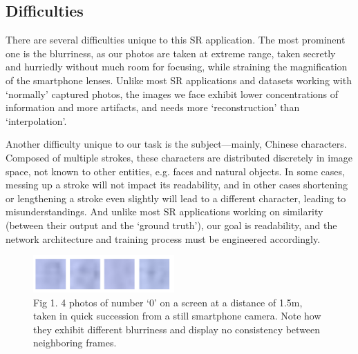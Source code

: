 \subsection{Difficulties}
There are several difficulties unique to this SR application. The most prominent one is the blurriness, as our photos are taken at extreme range, taken secretly and hurriedly without much room for focusing, while straining the magnification of the smartphone lenses. Unlike most SR applications and datasets working with ‘normally’ captured photos, the images we face exhibit lower concentrations of information and more artifacts, and needs more ‘reconstruction’ than ‘interpolation’.

Another difficulty unique to our task is the subject—mainly, Chinese characters. Composed of multiple strokes, these characters are distributed discretely in image space, not known to other entities, e.g. faces and natural objects. In some cases, messing up a stroke will not impact its readability, and in other cases shortening or lengthening a stroke even slightly will lead to a different character, leading to misunderstandings. And unlike most SR applications working on similarity (between their output and the ‘ground truth’), our goal is readability, and the network architecture and training process must be engineered accordingly.
 
\begin{figure}
	\centering
	\includegraphics[width=0.48\textwidth]{pic/zeros.png}
    \caption{ Fig 1. 4 photos of number ‘0’ on a screen at a distance of 1.5m, taken in quick succession from a still smartphone camera. Note how they exhibit different blurriness and display no consistency between neighboring frames.}
	\label{fig-zeros}
\end{figure}


